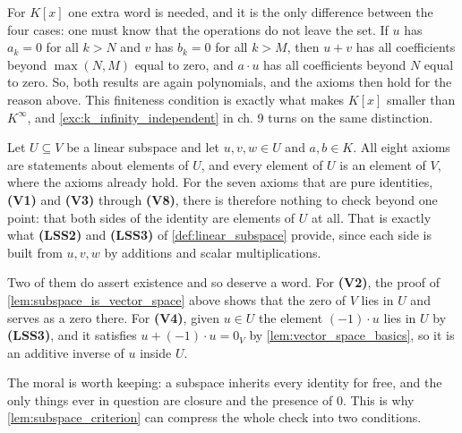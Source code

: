 \begin{exercisesolution}
For $K[x]$ one extra word is needed, and it is the only difference between the four cases: one must know that the operations do not leave the set. If $u$ has $a_k = 0$ for all $k > N$ and $v$ has $b_k = 0$ for all $k > M$, then $u + v$ has all coefficients beyond $\max(N, M)$ equal to zero, and $a \cdot u$ has all coefficients beyond $N$ equal to zero. So, both results are again polynomials, and the axioms then hold for the reason above. This finiteness condition is exactly what makes $K[x]$ smaller than $K^\infty$, and \cref{exc:k_infinity_independent} in ch. 9 turns on the same distinction.
\end{exercisesolution}

\begin{exercisesolution}
\label{sol:subspace_axioms}
Let $U \subseteq V$ be a linear subspace and let $u, v, w \in U$ and $a, b \in K$. All eight axioms are statements about elements of $U$, and every element of $U$ is an element of $V$, where the axioms already hold. For the seven axioms that are pure identities, \textbf{(V1)} and \textbf{(V3)} through \textbf{(V8)}, there is therefore nothing to check beyond one point: that both sides of the identity are elements of $U$ at all. That is exactly what \textbf{(LSS2)} and \textbf{(LSS3)} of \cref{def:linear_subspace} provide, since each side is built from $u, v, w$ by additions and scalar multiplications.

Two of them do assert existence and so deserve a word. For \textbf{(V2)}, the proof of \cref{lem:subspace_is_vector_space} above shows that the zero of $V$ lies in $U$ and serves as a zero there. For \textbf{(V4)}, given $u \in U$ the element $(-1) \cdot u$ lies in $U$ by \textbf{(LSS3)}, and it satisfies $u + (-1) \cdot u = 0_V$ by \cref{lem:vector_space_basics}, so it is an additive inverse of $u$ inside $U$.

The moral is worth keeping: a subspace inherits every identity for free, and the only things ever in question are closure and the presence of $0$. This is why \cref{lem:subspace_criterion} can compress the whole check into two conditions.
\end{exercisesolution}


